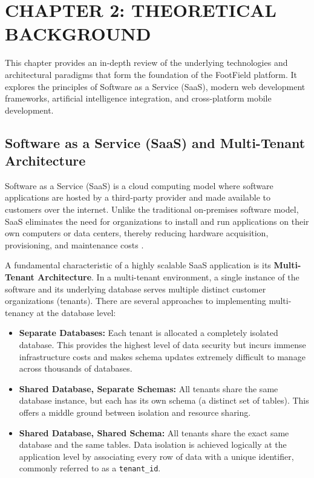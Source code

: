 \section*{CHAPTER 2: THEORETICAL BACKGROUND}
\setcounter{section}{2}
\setcounter{subsection}{0}
\setcounter{figure}{0}
\setcounter{table}{0}

This chapter provides an in-depth review of the underlying technologies and architectural paradigms that form the foundation of the FootField platform. It explores the principles of Software as a Service (SaaS), modern web development frameworks, artificial intelligence integration, and cross-platform mobile development.



\subsection{Software as a Service (SaaS) and Multi-Tenant Architecture}
Software as a Service (SaaS) is a cloud computing model where software applications are hosted by a third-party provider and made available to customers over the internet. Unlike the traditional on-premises software model, SaaS eliminates the need for organizations to install and run applications on their own computers or data centers, thereby reducing hardware acquisition, provisioning, and maintenance costs \cite{saas_architecture}.

A fundamental characteristic of a highly scalable SaaS application is its \textbf{Multi-Tenant Architecture}. In a multi-tenant environment, a single instance of the software and its underlying database serves multiple distinct customer organizations (tenants). There are several approaches to implementing multi-tenancy at the database level:
\begin{itemize}
    \item \textbf{Separate Databases:} Each tenant is allocated a completely isolated database. This provides the highest level of data security but incurs immense infrastructure costs and makes schema updates extremely difficult to manage across thousands of databases.
    \item \textbf{Shared Database, Separate Schemas:} All tenants share the same database instance, but each has its own schema (a distinct set of tables). This offers a middle ground between isolation and resource sharing.
    \item \textbf{Shared Database, Shared Schema:} All tenants share the exact same database and the same tables. Data isolation is achieved logically at the application level by associating every row of data with a unique identifier, commonly referred to as a \texttt{tenant\_id}. 
\end{itemize}


